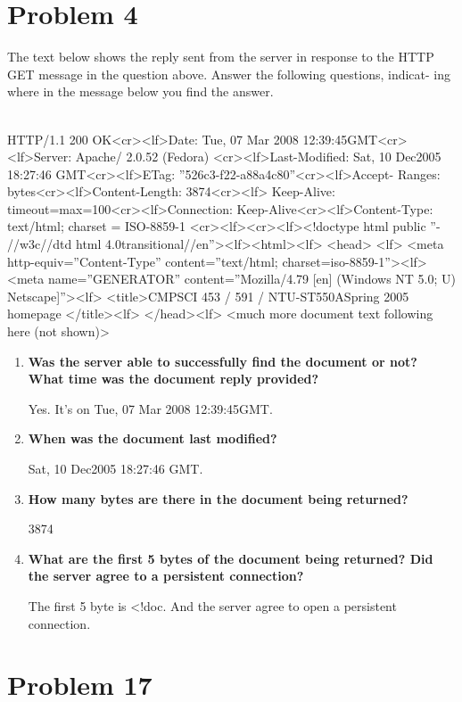 \documentclass[11pt]{article}
\newenvironment{qparts}{\begin{enumerate}[{(}a{)}]}{\end{enumerate}}
\begin{document}
\newpage
\section{Problem 4}

The text below shows the reply sent from the server in response to the HTTP GET message in the question above. Answer the following questions, indicat- ing where in the message below you find the answer.

~\\

HTTP/1.1 200 OK<cr><lf>Date: Tue, 07 Mar 2008 12:39:45GMT<cr><lf>Server: Apache/ 2.0.52 (Fedora) <cr><lf>Last-Modified: Sat, 10 Dec2005 18:27:46 GMT<cr><lf>ETag: ”526c3-f22-a88a4c80”<cr><lf>Accept- Ranges: bytes<cr><lf>Content-Length: 3874<cr><lf> Keep-Alive: timeout=max=100<cr><lf>Connection: Keep-Alive<cr><lf>Content-Type: text/html; charset = ISO-8859-1 <cr><lf><cr><lf><!doctype html public ”- //w3c//dtd html 4.0transitional//en”><lf><html><lf> <head> <lf> <meta http-equiv=”Content-Type” content=”text/html; charset=iso-8859-1”><lf> <meta name=”GENERATOR” content=”Mozilla/4.79 [en] (Windows NT 5.0; U) Netscape]”><lf> <title>CMPSCI 453 / 591 / NTU-ST550ASpring 2005 homepage </title><lf> </head><lf> <much more document text following here (not shown)>

\begin{qparts}
	\item \textbf{Was the server able to successfully find the document or not? What time was the document reply provided?
}

	Yes. It's on Tue, 07 Mar 2008 12:39:45GMT.
	
	\item \textbf{When was the document last modified?}
	
	Sat, 10 Dec2005 18:27:46 GMT.
	
	\item \textbf{How many bytes are there in the document being returned?}
	
	3874
	
	\item \textbf{What are the first 5 bytes of the document being returned? Did the server agree to a persistent connection?}

	The first 5 byte is <!doc. And the server agree to open a persistent connection.

\end{qparts}

\newpage
\section{Problem 17}
\end{document}
